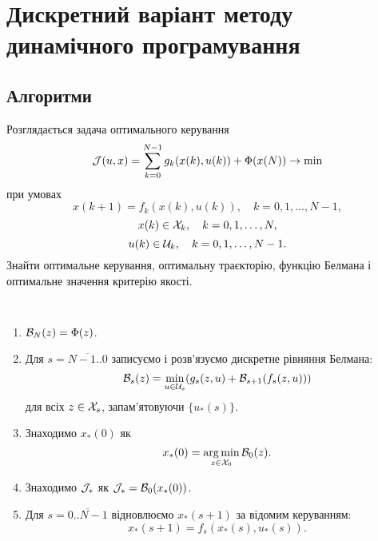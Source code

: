\section{Дискретний варіант методу динамічного програмування}

\subsection{Алгоритми}

\begin{problem*}
	Розглядається задача оптимального керування \[ \mathcal{J} (u, x) = \sum_{k=0}^{N-1} g_k(x(k),u(k))+\Phi(x(N))\to\min \] при умовах \[ x(k + 1) = f_k(x(k),u(k)), \quad k=0,1,\ldots,N-1, \] \[ x(k)\in\mathcal{X}_k, \quad k=0,1,\ldots,N, \] \[ u(k)\in\mathcal{U}_k, \quad k=0,1,\ldots,N-1. \] Знайти оптимальне керування, оптимальну траєкторію, функцію Белмана і оптимальне значення критерію якості.
\end{problem*}

\begin{algorithm} \tt
	\begin{enumerate}
		\item $\mathcal{B}_N(z) = \Phi(z)$.
		\item Для $s=\overline{N-1..0}$ записуємо і розв'язуємо дискретне рівняння Белмана: \[\mathcal{B}_s(z) = \min_{u\in \mathcal{U}_s} (g_s(z,u)+\mathcal{B}_{s+1}(f_s(z,u))) \] для всіх $z \in \mathcal{X}_s$, запам'ятовуючи $\{u_*(s)\}$.
		\item Знаходимо $x_*(0)$ як \[ x_*(0) = \operatorname*{arg\,min}_{z\in \mathcal{X}_0} \mathcal{B}_0(z).\]
		\item Знаходимо $\mathcal{J}_*$ як $\mathcal{J}_* = \mathcal{B}_0(x_*(0))$.
		\item Для $s=\overline{0..N-1}$ відновлюємо $x_*(s+1)$ за відомим керуванням: \[x_*(s+1) = f_s(x_*(s),u_*(s)).\] 
	\end{enumerate}
\end{algorithm}